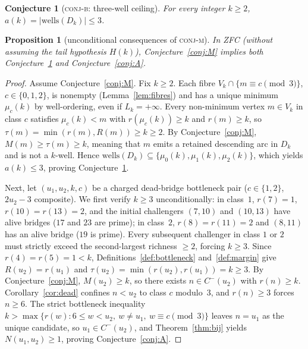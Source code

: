 \documentclass[11pt]{article}
\theoremstyle{plain}
\newtheorem{proposition}[theorem]{Proposition}
\newtheorem{conjecture}[theorem]{Conjecture}
\theoremstyle{definition}
\newcommand{\rch}{r}
\newcommand{\Vk}{V_{k}}
\newcommand{\Dk}{D_{k}}
\newcommand{\wells}{\mathrm{wells}}
\begin{document}
\begin{conjecture}[\textsc{conj-b}: three-well ceiling]
\label{conj:B}
For every integer $k \ge 2$, $a(k) = |\wells(\Dk)| \le 3$.
\end{conjecture}

\begin{proposition}[unconditional consequences of \textsc{conj-m}]
\label{prop:master}
In ZFC (without assuming the tail hypothesis $H(k)$),
Conjecture~\ref{conj:M} implies both Conjecture~\ref{conj:B} and
Conjecture~\ref{conj:A}.
\end{proposition}

\begin{proof}
Assume Conjecture~\ref{conj:M}. Fix $k \ge 2$. Each fibre
$\Vk \cap \{m \equiv c \pmod 3\}$, $c \in \{0,1,2\}$, is nonempty
(Lemma~\ref{lem:fibres}) and has a unique minimum $\mu_c(k)$ by
well-ordering, even if $L_k = +\infty$. Every non-minimum vertex
$m \in \Vk$ in class $c$ satisfies $\mu_c(k) < m$ with
$\rch(\mu_c(k)) \ge k$ and $\rch(m) \ge k$, so
$\tau(m) = \min(\rch(m), R(m)) \ge k \ge 2$. By
Conjecture~\ref{conj:M}, $M(m) \ge \tau(m) \ge k$, meaning that $m$
emits a retained descending arc in $\Dk$ and is not a $k$-well.
Hence $\wells(\Dk) \subseteq \{\mu_0(k),\mu_1(k),\mu_2(k)\}$, which
yields $a(k) \le 3$, proving Conjecture~\ref{conj:B}.

Next, let $(u_1,u_2,k,c)$ be a charged dead-bridge bottleneck pair
($c \in \{1,2\}$, $2u_2 - 3$ composite). We first verify $k \ge 3$
unconditionally: in class~$1$, $\rch(7) = 1$, $\rch(10) =
\rch(13) = 2$, and the initial challengers $(7,10)$ and $(10,13)$
have alive bridges ($17$ and $23$ are prime); in class~$2$,
$\rch(8) = \rch(11) = 2$ and $(8,11)$ has an alive bridge ($19$ is
prime). Every subsequent challenger in class $1$ or $2$ must
strictly exceed the second-largest richness $\ge 2$, forcing
$k \ge 3$. Since $\rch(4) = \rch(5) = 1 < k$, Definitions~\ref{def:bottleneck}
and~\ref{def:margin} give $R(u_2) = \rch(u_1)$ and
$\tau(u_2) = \min(\rch(u_2),\rch(u_1)) = k \ge 3$. By
Conjecture~\ref{conj:M}, $M(u_2) \ge k$, so there exists
$n \in C^{-}(u_2)$ with $\rch(n) \ge k$. Corollary~\ref{cor:dead}
confines $n < u_2$ to class $c$ modulo~$3$, and $\rch(n) \ge 3$
forces $n \ge 6$. The strict bottleneck inequality
$k > \max\{\rch(w) : 6 \le w < u_2,\ w \neq u_1,\ w \equiv c \pmod 3\}$
leaves $n = u_1$ as the unique candidate, so $u_1 \in C^{-}(u_2)$,
and Theorem~\ref{thm:bij} yields $N(u_1,u_2) \ge 1$, proving
Conjecture~\ref{conj:A}.
\end{proof}
\end{document}

